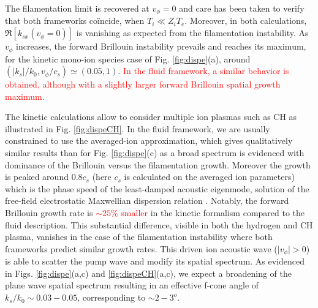 \documentclass[
 reprint,
 superscriptaddress,
 amsmath,amssymb,
 aps,
]{revtex4-1}
\def\tc{\textcolor{red}}
\begin{document}
The filamentation limit is recovered at $v_\phi=0$ and care has been taken to verify that both frameworks co\"incide, when $T_i\ll Z_iT_e$. Moreover, in both calculations, $\Re[k_{sx}(v_\phi=0)]$ is vanishing as expected from the filamentation instability. As $v_\phi$ increases, the forward Brillouin instability prevails and reaches its maximum, for the kinetic  mono-ion species case of Fig. \ref{fig:dispe}(a), around $(\vert k_s\vert/k_0, v_\phi/c_s) \simeq(0.05,1)$. 
\tc{
In the fluid framework, a similar behavior is obtained, although with a slightly larger forward Brillouin spatial  growth maximum. }

The kinetic calculations allow to consider multiple ion plasmas such as CH as illustrated in Fig. \ref{fig:dispeCH}. In the fluid framework, we are usually constrained to use the averaged-ion approximation, which gives qualitatively similar results than for Fig. \ref{fig:dispe}(c) as a broad spectrum is evidenced with  dominance of the Brillouin versus the filamentation growth. 
Moreover the growth is peaked around $0.8c_s$ (here $c_s$ is calculated on the averaged ion parameters) which is the phase speed of the least-damped acoustic eigenmode, solution of the free-field electrostatic Maxwellian dispersion relation \cite[]{POF_Fried_71,POP_Williams_95}.
Notably, the forward Brillouin growth rate is \tc{ $\sim 25\%$ smaller} in the kinetic formalism compared to the fluid description. This substantial difference, visible in both the hydrogen  and  CH plasma, vanishes in the case of the filamentation instability where both frameworks predict similar growth rates.
This driven ion acoustic wave ($\vert v_\phi\vert >0$) is able to  scatter the pump wave and modify its spatial spectrum. As evidenced in Figs. \ref{fig:dispe}(a,c) and \ref{fig:dispeCH}(a,c), we expect a broadening of the plane wave spatial spectrum  resulting in an effective  f-cone   angle  of $k_s/k_0\sim 0.03-0.05$, corresponding to $\sim 2-3^o$.  
\end{document}
